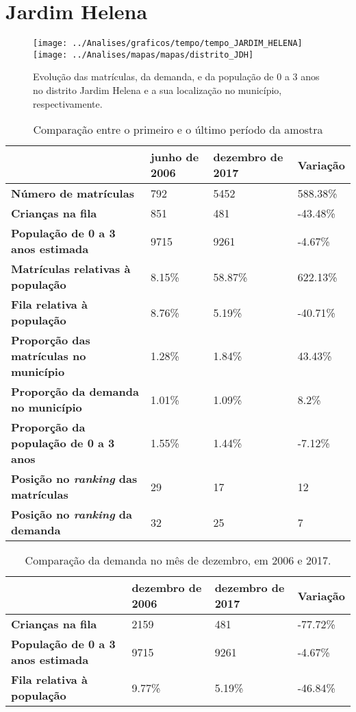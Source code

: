 \section{Jardim Helena}
\begin{figure}[H]
\centering
\texttt{[image: ../Analises/graficos/tempo/tempo\_JARDIM\_HELENA]}
\texttt{[image: ../Analises/mapas/mapas/distrito\_JDH]}
\caption{Evolução das matrículas, da demanda, e da população de 0 a 3 anos no distrito Jardim Helena e a sua localização no município, respectivamente.}
\end{figure}
\begin{table}[H]
\begin{tabular}{l|l|l|l}
\textbf{}                                      & \textbf{junho de 2006}       & \textbf{dezembro de 2017}    & \textbf{Variação} \\ \hline
\textbf{Número de matrículas}                  & 792 & 5452 & 588.38\% \\ \hline
\textbf{Crianças na fila}                      & 851 & 481 & -43.48\% \\ \hline
\textbf{População de 0 a 3 anos estimada}      & 9715 & 9261 & -4.67\% \\ \hline
\textbf{Matrículas relativas à população}      & 8.15\% & 58.87\% & 622.13\% \\ \hline
\textbf{Fila relativa à população}             & 8.76\% & 5.19\% & -40.71\% \\ \hline
\textbf{Proporção das matrículas no município} & 1.28\% & 1.84\% & 43.43\% \\ \hline
\textbf{Proporção da demanda no município}     & 1.01\% & 1.09\% & 8.2\% \\ \hline
\textbf{Proporção da população de 0 a 3 anos}  & 1.55\% & 1.44\% & -7.12\% \\ \hline
\textbf{Posição no \textit{ranking} das matrículas}     & 29 & 17 & 12 \\ \hline
\textbf{Posição no \textit{ranking} da demanda}         & 32 & 25 & 7 \\ 
\end{tabular}
\caption{Comparação entre o primeiro e o último período da amostra}
\end{table}
\begin{table}[H]
\begin{tabular}{l|l|l|l}
\textbf{}                                 & \textbf{dezembro de 2006} & \textbf{dezembro de 2017} & \textbf{Variação} \\ \hline
\textbf{Crianças na fila}                      & 2159 & 481 & -77.72\% \\ \hline
\textbf{População de 0 a 3 anos estimada}      & 9715 & 9261 & -4.67\% \\ \hline
\textbf{Fila relativa à população}             & 9.77\% & 5.19\% & -46.84\% \\
\end{tabular}
\caption{Comparação da demanda no mês de dezembro, em 2006 e 2017.}
\end{table}
